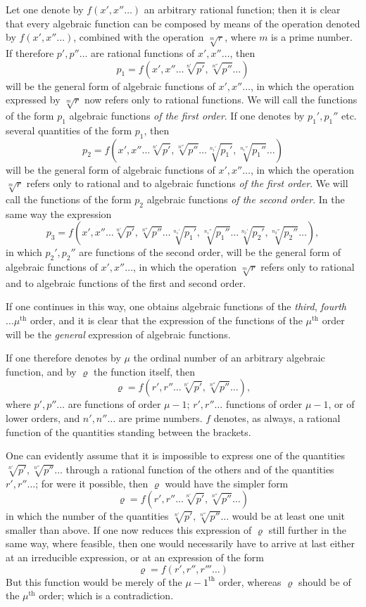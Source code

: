 \documentclass{article}
\begin{document}
Let one denote by $f(x', x'' \ldots)$ an arbitrary rational function; then it is clear that every algebraic function can be composed by means of the operation denoted by $f(x', x'' \ldots)$, combined with the operation $\sqrt[m]{r}$, where $m$ is a prime number. If therefore $p', p'' \ldots$ are rational functions of $x', x'' \ldots$, then
\[ p_1 = f(x', x'' \ldots \sqrt[n']{p'}, \sqrt[n'']{p''} \ldots) \]
will be the general form of algebraic functions of $x', x'' \ldots$, in which the operation expressed by $\sqrt[m]{r}$ now refers only to rational functions. We will call the functions of the form $p_1$ algebraic functions \emph{of the first order}. If one denotes by $p_1', p_1'' $ etc. several quantities of the form $p_1$, then
\[ p_2 = f(x', x'' \ldots \sqrt[n']{p'}, \sqrt[n'']{p''} \ldots \sqrt[n_1']{p_1'}, \sqrt[n_1'']{p_1''} \ldots) \]
will be the general form of algebraic functions of $x', x'' \ldots$, in which the operation $\sqrt[m]{r}$ refers only to rational and to algebraic functions \emph{of the first order}. We will call the functions of the form $p_2$ algebraic functions \emph{of the second order}. In the same way the expression
\[ p_3 = f(x', x'' \ldots \sqrt[n']{p'}, \sqrt[n'']{p''} \ldots \sqrt[n_1']{p_1'}, \sqrt[n_1'']{p_1''} \ldots \sqrt[n_2']{p_2'}, \sqrt[n_2'']{p_2''} \ldots), \]
in which $p_2', p_2''$ are functions of the second order, will be the general form of algebraic functions of $x', x'' \ldots$, in which the operation $\sqrt[m]{r}$ refers only to rational and to algebraic functions of the first and second order.

If one continues in this way, one obtains algebraic functions of the \emph{third}, \emph{fourth} $\ldots \mu^{\text{th}}$ order, and it is clear that the expression of the functions of the $\mu^{\text{th}}$ order will be the \emph{general} expression of algebraic functions.

If one therefore denotes by $\mu$ the ordinal number of an arbitrary algebraic function, and by $\varrho$ the function itself, then
\[ \varrho = f(r', r'' \ldots \sqrt[n']{p'}, \sqrt[n'']{p''} \ldots), \]
where $p', p'' \ldots$ are functions of order $\mu - 1$; $r', r'' \ldots$ functions of order $\mu - 1$, or of lower orders, and $n', n'' \ldots$ are prime numbers. $f$ denotes, as always, a rational function of the quantities standing between the brackets.

One can evidently assume that it is impossible to express one of the quantities $\sqrt[n']{p'}, \sqrt[n'']{p''} \ldots$ through a rational function of the others and of the quantities $r', r'' \ldots$; for were it possible, then $\varrho$ would have the simpler form
\[ \varrho = f(r', r'' \ldots \sqrt[n']{p'}, \sqrt[n'']{p''} \ldots) \]
in which the number of the quantities $\sqrt[n']{p'}, \sqrt[n'']{p''} \ldots$ would be at least one unit smaller than above. If one now reduces this expression of $\varrho$ still further in the same way, where feasible, then one would necessarily have to arrive at last either at an irreducible expression, or at an expression of the form
\[ \varrho = f(r', r'', r''' \ldots) \]
But this function would be merely of the $\mu - 1^{\text{th}}$ order, whereas $\varrho$ should be of the $\mu^{\text{th}}$ order; which is a contradiction.
\end{document}
